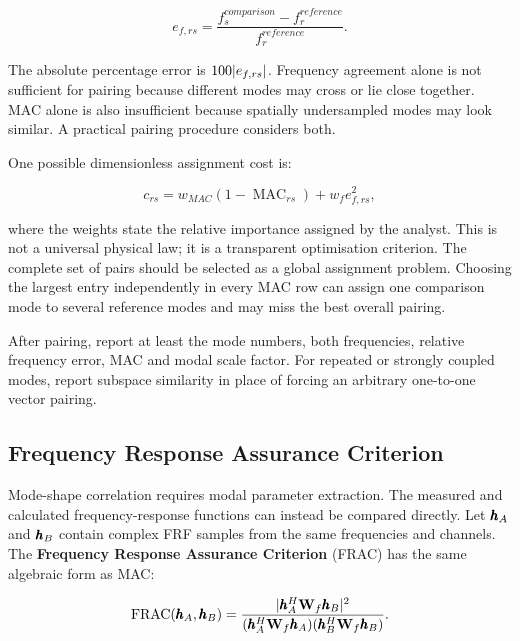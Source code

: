 \begin{equation}\label{relative-frequency-error}
    e_{f,rs}=
    \frac{f_s^{comparison}-f_r^{reference}}
         {f_r^{reference}}.
\end{equation}

The absolute percentage error is $100| {e_{f,rs}} |$. Frequency agreement alone
is not sufficient for pairing because different modes may cross or lie close
together. MAC alone is also insufficient because spatially undersampled modes
may look similar. A practical pairing procedure considers both.

One possible dimensionless assignment cost is:

\begin{equation}\label{combined-mode-pairing-cost}
    c_{rs}=w_{MAC}\left(1-\operatorname{MAC}_{rs}\right)
          +w_f e_{f,rs}^{2},
\end{equation}

where the weights state the relative importance assigned by the analyst. This
is not a universal physical law; it is a transparent optimisation criterion.
The complete set of pairs should be selected as a global assignment problem.
Choosing the largest entry independently in every MAC row can assign one
comparison mode to several reference modes and may miss the best overall
pairing.

After pairing, report at least the mode numbers, both frequencies, relative
frequency error, MAC and modal scale factor. For repeated or strongly coupled
modes, report subspace similarity in place of forcing an arbitrary one-to-one
vector pairing.

\subsection{Frequency Response Assurance Criterion}

Mode-shape correlation requires modal parameter extraction. The measured and
calculated frequency-response functions can instead be compared directly. Let
$\pmb{h}_A$ and $\pmb{h}_B$ contain complex FRF samples from the same frequencies
and channels. The
\textbf{Frequency Response Assurance Criterion} (FRAC) has the same algebraic
form as MAC:

\begin{bbox}
    \begin{equation}\label{frac-definition}
        \operatorname{FRAC}(\pmb{h}_A,\pmb{h}_B)
        =
        \frac{| {\pmb{h}_A^{H}\mathbf{W}_f\pmb{h}_B} |^{2}}
        {(\pmb{h}_A^{H}\mathbf{W}_f\pmb{h}_A)
         (\pmb{h}_B^{H}\mathbf{W}_f\pmb{h}_B)}.
    \end{equation}
\end{bbox}

